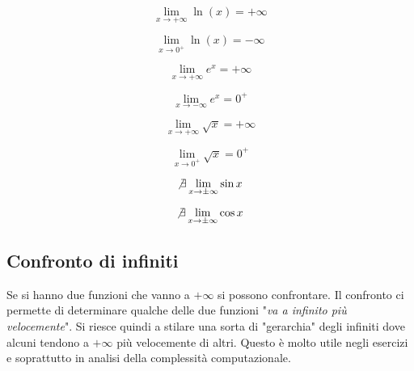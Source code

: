 \begin{multicols}{2}
    \begin{equation*}
        \lim _{x \to +\infty} \ln(x) = +\infty
    \end{equation*}
    
    \begin{equation*}
        \lim _{x \to 0^+} \ln(x) = -\infty
    \end{equation*}
    
    \begin{equation*}
        \lim _{x \to +\infty} e^x = +\infty
    \end{equation*}

    \begin{equation*}
        \lim _{x \to -\infty} e^x = 0^+
    \end{equation*}

    \begin{equation*}
        \lim _{x \to +\infty} \sqrt{x} = +\infty
    \end{equation*}

    \begin{equation*}
        \lim _{x \to 0^+} \sqrt{x} = 0^+
    \end{equation*}

    \begin{equation*}
        \not \exists \lim _{x \to \pm \infty} \sin{x}
    \end{equation*}
    
    \begin{equation*}
        \not \exists \lim _{x \to \pm \infty} \cos{x}
    \end{equation*}
\end{multicols}


\subsection{Confronto di infiniti} \label{sec_gerarchiaInfiniti}

Se si hanno due funzioni che vanno a $+\infty$ si possono confrontare. Il confronto ci permette di determinare qualche delle due funzioni "\textit{va a infinito più velocemente}". Si riesce quindi a stilare una sorta di "gerarchia" degli infiniti dove alcuni tendono a $+\infty$ più velocemente di altri. Questo è molto utile negli esercizi e soprattutto in analisi della complessità computazionale.\\

